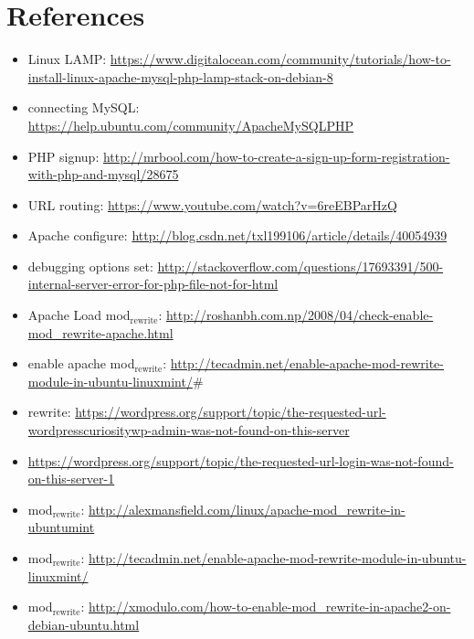 \documentclass[9pt,b5paper]{article}
\begin{document}
\section{References}
\label{sec-5}
\begin{itemize}
\item Linux LAMP: \url{https://www.digitalocean.com/community/tutorials/how-to-install-linux-apache-mysql-php-lamp-stack-on-debian-8}
\item connecting MySQL: \url{https://help.ubuntu.com/community/ApacheMySQLPHP}
\item PHP signup: \url{http://mrbool.com/how-to-create-a-sign-up-form-registration-with-php-and-mysql/28675}
\item URL routing: \url{https://www.youtube.com/watch?v=6reEBParHzQ}
\item Apache configure: \url{http://blog.csdn.net/txl199106/article/details/40054939}
\item debugging options set: \url{http://stackoverflow.com/questions/17693391/500-internal-server-error-for-php-file-not-for-html}
\item Apache Load mod$_{\text{rewrite}}$: \url{http://roshanbh.com.np/2008/04/check-enable-mod_rewrite-apache.html}
\item enable apache mod$_{\text{rewrite}}$: \url{http://tecadmin.net/enable-apache-mod-rewrite-module-in-ubuntu-linuxmint/}\#
\item rewrite: \url{https://wordpress.org/support/topic/the-requested-url-wordpresscuriositywp-admin-was-not-found-on-this-server}
\item \url{https://wordpress.org/support/topic/the-requested-url-login-was-not-found-on-this-server-1}
\item mod$_{\text{rewrite}}$: \url{http://alexmansfield.com/linux/apache-mod_rewrite-in-ubuntumint}
\item mod$_{\text{rewrite}}$: \url{http://tecadmin.net/enable-apache-mod-rewrite-module-in-ubuntu-linuxmint/}
\item mod$_{\text{rewrite}}$: \url{http://xmodulo.com/how-to-enable-mod_rewrite-in-apache2-on-debian-ubuntu.html}
\end{itemize}
\end{document}
